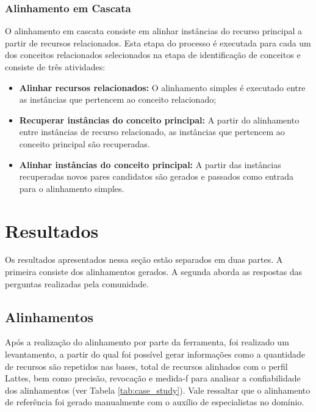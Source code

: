 \subsubsection{Alinhamento em Cascata}
O alinhamento em cascata consiste em alinhar instâncias do recurso principal a partir de recursos relacionados. Esta etapa do processo é executada para cada um dos conceitos relacionados selecionados na etapa de identificação de conceitos e consiste de três atividades:
\begin{itemize}
	\item \textbf{Alinhar recursos relacionados:} O alinhamento simples é executado entre as instâncias que pertencem ao conceito relacionado;
	
	\item \textbf{Recuperar instâncias do conceito principal:} A partir do alinhamento entre instâncias de recurso relacionado, as instâncias que pertencem ao conceito principal são recuperadas.
	
	\item \textbf{Alinhar instâncias do conceito principal:} A partir das instâncias recuperadas novos pares candidatos são gerados e passados como entrada para o alinhamento simples.
\end{itemize}


\section{Resultados}
\label{sec:resultados}
Os resultados apresentados nessa seção estão separados em duas partes. A primeira consiste dos alinhamentos gerados. A segunda aborda as respostas das perguntas realizadas pela comunidade.

\subsection{Alinhamentos}
Após a realização do alinhamento por parte da ferramenta, foi realizado um levantamento, a partir do qual foi possível gerar informações como a quantidade de recursos são repetidos nas bases, total de recursos alinhados com o perfil Lattes, bem como precisão, revocação e medida-f \cite{goutte2005probabilistic} para analisar a confiabilidade dos alinhamentos (ver Tabela \ref{tab:case_study}). Vale ressaltar que o alinhamento de referência foi gerado manualmente com o auxílio de especialistas no domínio.
% 
% 
%
%
%
%

